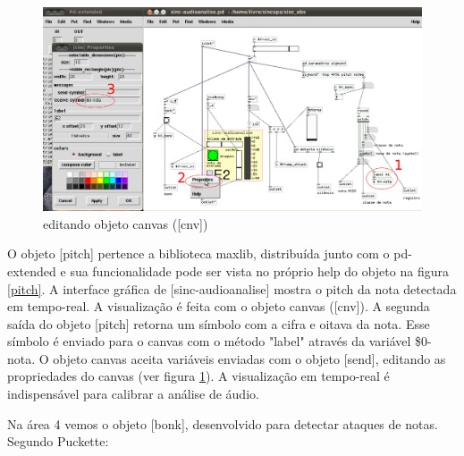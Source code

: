 \documentclass[draft]{ppgmus}
\begin{document}
\begin{figure}
\includegraphics[scale=.5]{canvas-edit}
\caption{editando objeto canvas ([cnv])}
\label{canvas-edit}
\end{figure}


O objeto [pitch] pertence a biblioteca maxlib, distribuída junto com o 
pd-extended e sua funcionalidade pode ser vista no próprio help do objeto na 
figura \ref{pitch}. A interface gráfica de [sinc-audioanalise] mostra o pitch
da nota detectada em tempo-real. A visualização é feita com o objeto canvas ([cnv]).
A segunda saída do objeto [pitch] retorna um símbolo com a cifra e oitava
da nota. Esse símbolo é enviado para o canvas com o método "label" através
da variável \$0-nota. O objeto canvas aceita variáveis enviadas com o objeto [send],
editando as propriedades do canvas (ver figura \ref{canvas-edit}). A visualização em tempo-real
é indispensável para calibrar a análise de áudio.




Na área 4 vemos o objeto [bonk\texttildelow], desenvolvido para
detectar ataques de notas. Segundo Puckette:
\end{document}
